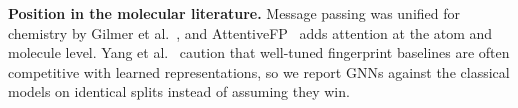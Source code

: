 \textbf{Position in the molecular literature.} Message passing was unified for chemistry by Gilmer et al.~\cite{gilmer2017mpnn}, and AttentiveFP~\cite{xiong2020attentivefp} adds attention at the atom and molecule level. Yang et al.~\cite{yang2019analyzing} caution that well-tuned fingerprint baselines are often competitive with learned representations, so we report GNNs against the classical models on identical splits instead of assuming they win.
